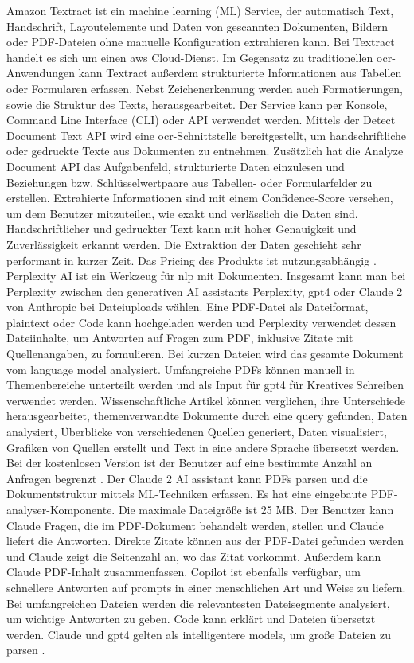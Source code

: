 Amazon Textract ist ein machine learning (ML) Service, der automatisch Text, Handschrift, Layoutelemente und Daten von gescannten Dokumenten, Bildern oder PDF-Dateien ohne manuelle Konfiguration extrahieren kann. Bei Textract handelt es sich um einen \gls{aws} Cloud-Dienst. Im Gegensatz zu traditionellen \gls{ocr}-Anwendungen kann Textract außerdem strukturierte Informationen aus Tabellen oder Formularen erfassen. Nebst Zeichenerkennung werden auch Formatierungen, sowie die Struktur des Texts, herausgearbeitet. Der Service kann per Konsole, Command Line Interface (CLI) oder API verwendet werden. Mittels der Detect Document Text API wird eine \gls{ocr}-Schnittstelle bereitgestellt, um handschriftliche oder gedruckte Texte aus Dokumenten zu entnehmen. Zusätzlich hat die Analyze Document API das Aufgabenfeld, strukturierte Daten einzulesen und Beziehungen bzw. Schlüsselwertpaare aus Tabellen- oder Formularfelder zu erstellen. Extrahierte Informationen sind mit einem Confidence-Score versehen, um dem Benutzer mitzuteilen, wie exakt und verlässlich die Daten sind. Handschriftlicher und gedruckter Text kann mit hoher Genauigkeit und Zuverlässigkeit erkannt werden. Die Extraktion der Daten geschieht sehr performant in kurzer Zeit. Das Pricing des Produkts ist nutzungsabhängig \cite{textract}. \\
Perplexity AI ist ein Werkzeug für \gls{nlp} mit Dokumenten. Insgesamt kann man bei Perplexity zwischen den generativen AI assistants Perplexity, \gls{gpt4} oder Claude 2 von Anthropic bei Dateiuploads wählen. Eine PDF-Datei als Dateiformat, plaintext oder Code kann hochgeladen werden und Perplexity verwendet dessen Dateiinhalte, um Antworten auf Fragen zum PDF, inklusive Zitate mit Quellenangaben, zu formulieren. Bei kurzen Dateien wird das gesamte Dokument vom language model analysiert. Umfangreiche PDFs können manuell in Themenbereiche unterteilt werden und als Input für \gls{gpt4} für Kreatives Schreiben verwendet werden. Wissenschaftliche Artikel können verglichen, ihre Unterschiede herausgearbeitet, themenverwandte Dokumente durch eine query gefunden, Daten analysiert, Überblicke von verschiedenen Quellen generiert, Daten visualisiert, Grafiken von Quellen erstellt und Text in eine andere Sprache übersetzt werden. Bei der kostenlosen Version ist der Benutzer auf eine bestimmte Anzahl an Anfragen begrenzt \cite{hackernoon-claude}. Der Claude 2 AI assistant kann PDFs parsen und die Dokumentstruktur mittels ML-Techniken erfassen. Es hat eine eingebaute PDF-analyser-Komponente. Die maximale Dateigröße ist 25 MB. Der Benutzer kann Claude Fragen, die im PDF-Dokument behandelt werden, stellen und Claude liefert die Antworten. Direkte Zitate können aus der PDF-Datei gefunden werden und Claude zeigt die Seitenzahl an, wo das Zitat vorkommt. Außerdem kann Claude PDF-Inhalt zusammenfassen. Copilot ist ebenfalls verfügbar, um schnellere Antworten auf prompts in einer menschlichen Art und Weise zu liefern. Bei umfangreichen Dateien werden die relevantesten Dateisegmente analysiert, um wichtige Antworten zu geben. Code kann erklärt und Dateien übersetzt werden. Claude und \gls{gpt4} gelten als intelligentere models, um große Dateien zu parsen \cite{perplexity}. \\
